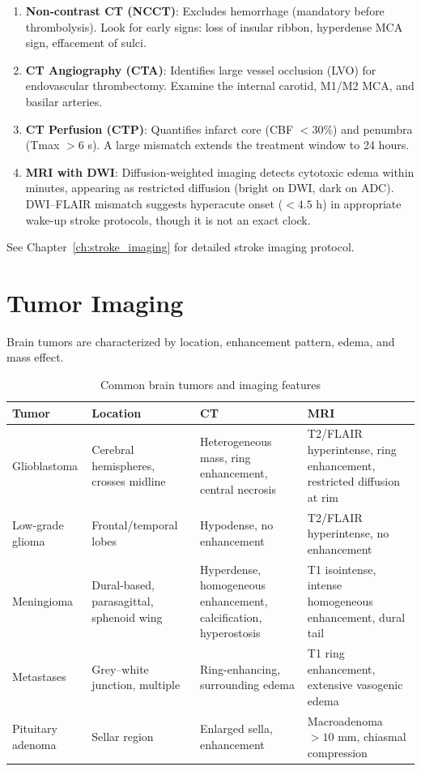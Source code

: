 \begin{enumerate}
  \item \textbf{Non-contrast CT (NCCT)}: Excludes hemorrhage (mandatory before thrombolysis). Look for early signs: loss of insular ribbon, hyperdense MCA sign, effacement of sulci.
  \item \textbf{CT Angiography (CTA)}: Identifies large vessel occlusion (LVO) for endovascular thrombectomy. Examine the internal carotid, M1/M2 MCA, and basilar arteries.
  \item \textbf{CT Perfusion (CTP)}: Quantifies infarct core (CBF $< 30\%$) and penumbra (Tmax $> 6$ s). A large mismatch extends the treatment window to 24 hours.
  \item \textbf{MRI with DWI}: Diffusion-weighted imaging detects cytotoxic edema within minutes, appearing as restricted diffusion (bright on DWI, dark on ADC). DWI--FLAIR mismatch suggests hyperacute onset ($< 4.5$ h) in appropriate wake-up stroke protocols, though it is not an exact clock.
\end{enumerate}

See Chapter~\ref{ch:stroke_imaging} for detailed stroke imaging protocol.


\section{Tumor Imaging}
Brain tumors are characterized by location, enhancement pattern, edema, and mass effect.

\begin{table}[h]
\centering
\caption{Common brain tumors and imaging features}
\begin{tabular}{p{2.5cm} p{3cm} p{3cm} p{3cm}}
\hline
\textbf{Tumor} & \textbf{Location} & \textbf{CT} & \textbf{MRI} \\
\hline
Glioblastoma & Cerebral hemispheres, crosses midline & Heterogeneous mass, ring enhancement, central necrosis & T2/FLAIR hyperintense, ring enhancement, restricted diffusion at rim \\
Low-grade glioma & Frontal/temporal lobes & Hypodense, no enhancement & T2/FLAIR hyperintense, no enhancement \\
Meningioma & Dural-based, parasagittal, sphenoid wing & Hyperdense, homogeneous enhancement, calcification, hyperostosis & T1 isointense, intense homogeneous enhancement, dural tail \\
Metastases & Grey--white junction, multiple & Ring-enhancing, surrounding edema & T1 ring enhancement, extensive vasogenic edema \\
Pituitary adenoma & Sellar region & Enlarged sella, enhancement & Macroadenoma $> 10$ mm, chiasmal compression \\
\hline
\end{tabular}
\end{table}

